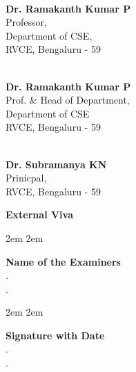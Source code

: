 \linespread{1}

\begin{center}

	\medskip
	\begin{multicols}{3}

		\columnbreak

		\hrulefill\\
		\small \textbf{Dr. Ramakanth Kumar P}
		\small{
			\\ Professor,
			\\Department of CSE,
			\\RVCE, Bengaluru - 59
		}\\

		\columnbreak

		\hrulefill\\
		\smallskip
		\small \textbf{Dr. Ramakanth Kumar P}
		\small{
			\\Prof. \& Head of Department,
			\\Department of CSE
			\\RVCE, Bengaluru - 59
		}\\

		\columnbreak

		\hrulefill\\
		\smallskip
		\small  \textbf{Dr. Subramanya KN}
		\small{
			\\Prinicpal,
			\\RVCE, Bengaluru - 59
		}\\
	\end{multicols}


	\bigskip
	\bigskip
	\large \textbf{External Viva}
	\begin{multicols}{2}

		\begingroup
			\leftskip2em
			\rightskip2em

			\normalsize \textbf{Name of the Examiners}
			\\
			. \hrulefill\\
			. \hrulefill\\

		\endgroup

		\columnbreak

		\begingroup
			\leftskip2em
			\rightskip2em

			\normalsize \textbf{Signature with Date} \\
			. \hrulefill\\
			. \hrulefill\\
		\endgroup


	\end{multicols}
\end{center}


